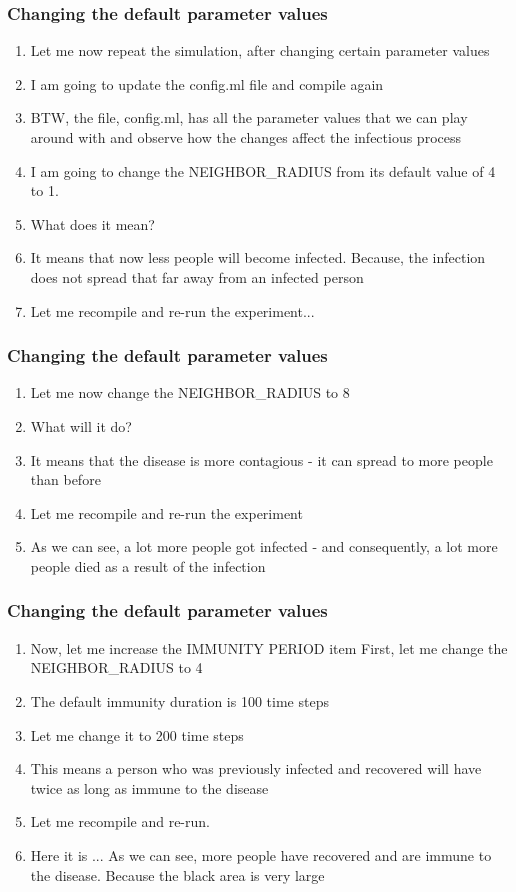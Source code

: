 \documentclass{beamer}
\begin{document}
 
 
 \frame
{
  \frametitle{Changing the default parameter values}
  
\begin{enumerate}
\item Let me now repeat the simulation, after changing certain parameter values
\item I am going to update the config.ml file and compile again
\item BTW, the file, config.ml, has all the parameter values that we can play around with and observe how the changes affect the infectious process
\item I am going to change the NEIGHBOR\_RADIUS from its default value of 4 to 1. 
\item What does it mean?
\item It means that now less people will become infected. Because, the infection does not spread that far away from an infected person
\item Let me recompile and re-run the experiment...
\end{enumerate}
 
 }
 
 
  \frame
{
\frametitle{Changing the default parameter values}
  
\begin{enumerate}
\item Let me now change the NEIGHBOR\_RADIUS to 8
\item What will it do?
\item It means that the disease is more contagious - it can spread to more people than before
\item Let me recompile and re-run the experiment
\item As we can see, a lot more people got infected - and consequently, a lot more people died as a result of the infection
\end{enumerate}
  }
  
\frame
{
\frametitle{Changing the default parameter values}

\begin{enumerate}
\item Now, let me increase the IMMUNITY PERIOD
item First, let me change the NEIGHBOR\_RADIUS to 4
\item The default immunity duration is 100 time steps
\item Let me change it to 200 time steps
\item This means a person who was previously infected and recovered will have twice as long as immune to the disease
\item Let me recompile and re-run. 
\item Here it is ... As we can see, more people have recovered and are immune to the disease. Because the black area is very large
\end{enumerate}
}
\end{document}
